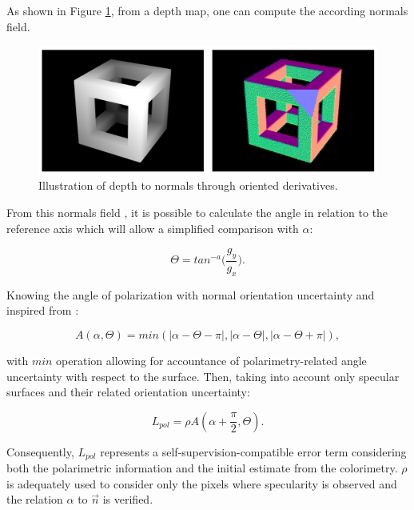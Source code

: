 As shown in Figure \ref{fig:normalsfromcube}, from a depth map, one can compute the according normals field.

\begin{figure}[h]
	\centering
	\includegraphics[width=0.8\linewidth]{Figures/Fusion/normalsfromcube}
	\caption[Illustration of depth to normals through oriented derivatives.]{Illustration of depth to normals through oriented derivatives.}
	\label{fig:normalsfromcube}
\end{figure}

From this normals field , it is possible to calculate the angle in relation to the reference axis which will allow a simplified comparison with $\alpha$:

\begin{equation}\label{ntoa}
	\Theta = tan^{-a}\Big( \frac{g_y}{g_x} \Big).
\end{equation}

Knowing the angle of polarization with normal orientation uncertainty and inspired from \cite{cui2017polarimetric}:

\begin{equation}
	A (\alpha, \Theta) = min(|\alpha - \Theta - \pi| , |\alpha - \Theta| , |\alpha  - \Theta + \pi|),
\end{equation}

with $min$ operation allowing for accountance of polarimetry-related angle uncertainty with respect to the surface.
Then, taking into account only specular surfaces and their related orientation uncertainty:

\begin{equation}\label{regu}
	L_{pol} = \rho A(\alpha + \frac{\pi}{2} , \Theta).
\end{equation}

Consequently, $L_{pol}$ represents a self-supervision-compatible error term considering both the polarimetric information and the initial estimate from the colorimetry. $\rho$ is adequately used to consider only the pixels where specularity is observed and the relation $\alpha$ to $\vec{n}$ is verified.


